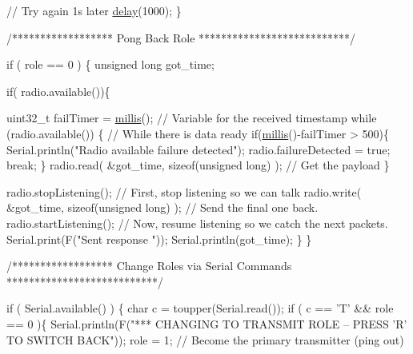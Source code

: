 \begin{DoxyCodeInclude}
    \textcolor{comment}{// Try again 1s later}
    \hyperlink{group__Porting__General_ga70a331e8ddf9acf9d33c47b71cda4c5f}{delay}(1000);
  \}



\textcolor{comment}{/****************** Pong Back Role ***************************/}

  \textcolor{keywordflow}{if} ( role == 0 )
  \{
    \textcolor{keywordtype}{unsigned} \textcolor{keywordtype}{long} got\_time;
    
    \textcolor{keywordflow}{if}( radio.available())\{
      
      uint32\_t failTimer = \hyperlink{group__Porting__General_gad5b3ec1ce839fa1c4337a7d0312e9749}{millis}();                                                         \textcolor{comment}{//
       Variable for the received timestamp}
      \textcolor{keywordflow}{while} (radio.available()) \{                                 \textcolor{comment}{// While there is data ready}
        \textcolor{keywordflow}{if}(\hyperlink{group__Porting__General_gad5b3ec1ce839fa1c4337a7d0312e9749}{millis}()-failTimer > 500)\{
          Serial.println(\textcolor{stringliteral}{"Radio available failure detected"});
          radio.failureDetected = \textcolor{keyword}{true};
          \textcolor{keywordflow}{break};
        \}
        radio.read( &got\_time, \textcolor{keyword}{sizeof}(\textcolor{keywordtype}{unsigned} \textcolor{keywordtype}{long}) );             \textcolor{comment}{// Get the payload}
      \}
     
      radio.stopListening();                                        \textcolor{comment}{// First, stop listening so we can talk
         }
      radio.write( &got\_time, \textcolor{keyword}{sizeof}(\textcolor{keywordtype}{unsigned} \textcolor{keywordtype}{long}) );              \textcolor{comment}{// Send the final one back.      }
      radio.startListening();                                       \textcolor{comment}{// Now, resume listening so we catch
       the next packets.     }
      Serial.print(F(\textcolor{stringliteral}{"Sent response "}));
      Serial.println(got\_time);  
   \}
 \}




\textcolor{comment}{/****************** Change Roles via Serial Commands ***************************/}

  \textcolor{keywordflow}{if} ( Serial.available() )
  \{
    \textcolor{keywordtype}{char} c = toupper(Serial.read());
    \textcolor{keywordflow}{if} ( c == \textcolor{charliteral}{'T'} && role == 0 )\{      
      Serial.println(F(\textcolor{stringliteral}{"*** CHANGING TO TRANSMIT ROLE -- PRESS 'R' TO SWITCH BACK"}));
      role = 1;                  \textcolor{comment}{// Become the primary transmitter (ping out)}
    

\end{DoxyCodeInclude}
